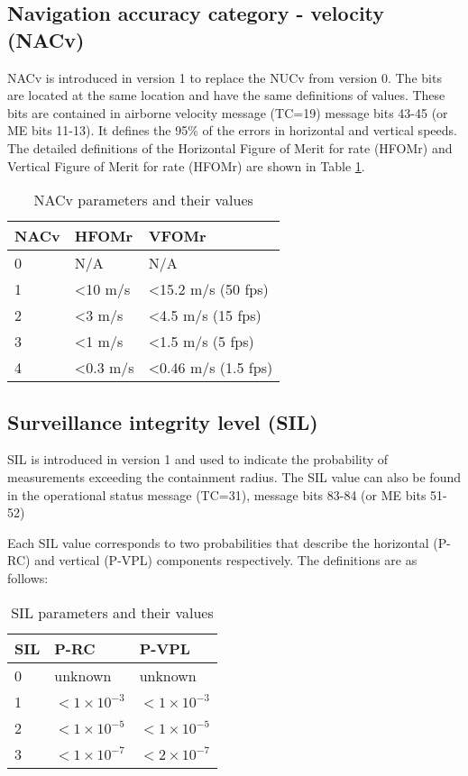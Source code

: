\subsection{Navigation accuracy category - velocity (NACv)}

NACv is introduced in version 1 to replace the NUCv from version 0. The bits are located at the same location and have the same definitions of values. These bits are contained in airborne velocity message (TC=19) message bits 43-45 (or ME bits 11-13). It defines the 95\% of the errors in horizontal and vertical speeds. The detailed definitions of the Horizontal Figure of Merit for rate (HFOMr) and Vertical Figure of Merit for rate (HFOMr) are shown in Table \ref{tb:nacv-params}.

\begin{table}[!ht]
\caption{NACv parameters and their values}
\label{tb:nacv-params}
\begin{tabular}{|l|l|l|}
\hline
\textbf{NACv} & \textbf{HFOMr} & \textbf{VFOMr} \\ \hline
0 & N/A & N/A \\ \hline
1 & \textless 10 m/s & \textless 15.2 m/s (50 fps) \\ \hline
2 & \textless 3 m/s & \textless 4.5 m/s (15 fps) \\ \hline
3 & \textless 1 m/s & \textless 1.5 m/s (5 fps) \\ \hline
4 & \textless 0.3 m/s & \textless 0.46 m/s (1.5 fps) \\ \hline
\end{tabular}
\end{table}


\subsection{Surveillance integrity level (SIL)}

SIL is introduced in version 1 and used to indicate the probability of measurements exceeding the containment radius. The SIL value can also be found in the operational status message (TC=31), message bits 83-84 (or ME bits 51-52)

Each SIL value corresponds to two probabilities that describe the horizontal (P-RC) and vertical (P-VPL) components respectively. The definitions are as follows:

\begin{table}[!ht]
\caption{SIL parameters and their values}
\label{tb:sil-params}
\begin{tabular}{|l|l|l|}
\hline
SIL & P-RC & P-VPL \\ \hline
0 & unknown & unknown \\ \hline
1 & $< 1 \times 10^{-3}$ & $< 1 \times 10^{-3}$ \\ \hline
2 & $< 1 \times 10^{-5}$ & $< 1 \times 10^{-5}$ \\ \hline
3 & $< 1 \times 10^{-7}$ & $< 2 \times 10^{-7}$ \\ \hline
\end{tabular}
\end{table}

